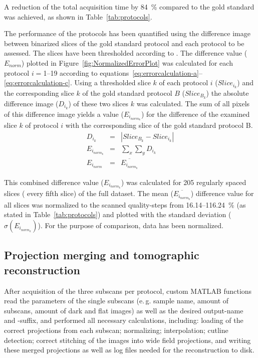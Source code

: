 \documentclass[preprint,s]{iucr}
\begin{document}
A reduction of the total acquisition time by \SI{84}{\percent} compared to the gold standard was achieved, as shown in Table~\ref{tab:protocols}.

The performance of the protocols has been quantified using the difference image between binarized slices of the gold standard protocol and each protocol to be assessed. The slices have been thresholded according to . The difference value ($E_{norm}$) plotted in Figure~\ref{fig:NormalizedErrorPlot} was calculated for each protocol $i=$1--19 according to equations~\ref{eq:errorcalculation-a}--\ref{eq:errorcalculation-c}. Using a thresholded slice $k$ of each protocol $i$ ($Slice_{i_{k}}$) and the corresponding slice $k$ of the gold standard protocol $B$ ($Slice_{B_{k}}$) the absolute difference image ($D_{i_{k}}$) of these two slices $k$ was calculated. The sum of all pixels of this difference image yields a value ($E_{i_{norm_{k}}}$) for the difference of the examined slice $k$ of protocol $i$ with the corresponding slice of the gold standard protocol B.
\begin{eqnarray}
	D_{i_{k}} &=& |Slice_{B_{k}}-Slice_{i_{k}}|\label{eq:errorcalculation-a}\\%
	E_{i_{norm_{k}}} &=& \sum_{x}\sum_{y} D_{i_{k}}\label{eq:errorcalculation-b}\\%
	E_{i_{norm}} &=& \overline{E_{i_{norm_{k}}}}\label{eq:errorcalculation-c}%
\end{eqnarray}

This combined difference value ($E_{i_{norm_{k}}}$) was calculated for 205 regularly spaced slices (%
every fifth slice) of the full dataset. The mean ($\overline{E_{i_{norm_{k}}}}$) difference value for all slices was normalized to the scanned quality-steps from 16.14--\SI{116.24}{\percent} (as stated in Table~\ref{tab:protocols}) and plotted with the standard deviation ($\sigma(E_{i_{norm_{k}}})$). For the purpose of comparison, data has been normalized.

\subsection{Projection merging and tomographic reconstruction}
After acquisition of the three subscans per protocol, custom MATLAB functions read the parameters of the single subscans (e.\,g. sample name, amount of subscans, amount of dark and flat images) as well as the desired output-name and -suffix, and performed all necessary calculations, including: loading of the correct projections from each subscan; normalizing; interpolation; cutline detection; correct stitching of the images into wide field projections, and writing these merged projections as well as log files needed for the reconstruction to disk.
\end{document}
